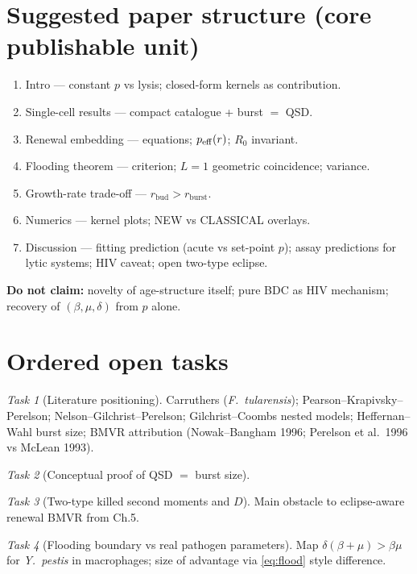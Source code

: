 \documentclass[11pt,a4paper]{article}
\theoremstyle{plain}
\theoremstyle{definition}
\theoremstyle{remark}
\newtheorem{task}{Task}[section]
\begin{document}
\section{Suggested paper structure (core publishable unit)}
\label{sec:paper-plan}

\begin{enumerate}
\item Intro --- constant $p$ vs lysis; closed-form kernels as contribution.
\item Single-cell results --- compact catalogue + burst $=$ QSD.
\item Renewal embedding --- equations; $p_{\rm eff}(r)$; $R_0$ invariant.
\item Flooding theorem --- criterion; $L=1$ geometric coincidence; variance.
\item Growth-rate trade-off --- $r_{\mathrm{bud}}>r_{\mathrm{burst}}$.
\item Numerics --- kernel plots; NEW vs CLASSICAL overlays.
\item Discussion --- fitting prediction (acute vs set-point $p$); assay
  predictions for lytic systems; HIV caveat; open two-type eclipse.
\end{enumerate}

\textbf{Do not claim:} novelty of age-structure itself; pure BDC as HIV mechanism;
recovery of $(\beta,\mu,\delta)$ from $p$ alone.

\section{Ordered open tasks}
\label{sec:tasks}

\begin{task}[Literature positioning]
Carruthers (\textit{F.~tularensis}); Pearson--Krapivsky--Perelson; Nelson--Gilchrist--Perelson;
Gilchrist--Coombs nested models; Heffernan--Wahl burst size; BMVR attribution
(Nowak--Bangham 1996; Perelson et al.\ 1996 vs McLean 1993).
\end{task}

\begin{task}[Conceptual proof of QSD $=$ burst size]
\end{task}

\begin{task}[Two-type killed second moments and $D$]
Main obstacle to eclipse-aware renewal BMVR from Ch.5.
\end{task}

\begin{task}[Flooding boundary vs real pathogen parameters]
Map $\delta(\beta+\mu)>\beta\mu$ for \textit{Y.~pestis} in macrophages; size of
advantage via \eqref{eq:flood} style difference.
\end{task}
\end{document}
